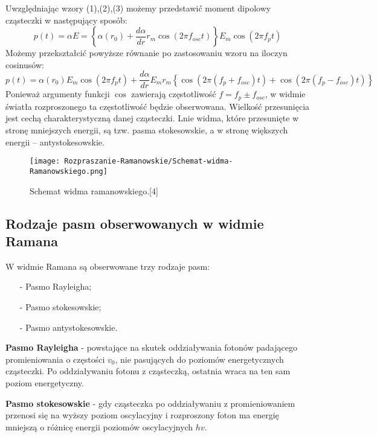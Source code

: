 Uwzględniając wzory (1),(2),(3) możemy przedstawić moment dipolowy cząsteczki w następujący
sposób:
\begin{equation}
	p(t) = \alpha E = 
	\left\{ 
		\alpha(r_{0}) + \frac{d\alpha}{dr}r_{m}\cos (2\pi f_{osc}t) 
	\right\}
	E_{m}\cos (2\pi f_{p}t)
\end{equation}
Możemy przekształcić powyższe równanie po zastosowaniu wzoru na iloczyn cosinusów:
\begin{equation}
	p(t) = \alpha(r_{0})E_{m}\cos (2\pi f_{p}t) + \frac{d\alpha}{dr}E_{m}r_{m}
	\left\{
		\cos (2\pi (f_{p} + f_{osc})t) + \cos (2\pi (f_{p} - f_{osc})t)
	 \right\}
\end{equation}
Ponieważ argumenty funkcji $\cos$ zawierają częstotliwość $f = f_{p} \pm f_{osc}$, w widmie światła
rozproszonego ta częstotliwość będzie obserwowana. Wielkość przesunięcia jest cechą charakterystyczną danej cząsteczki. Lnie widma, które przesunięte w stronę mniejszych energii, są tzw. pasma stokesowskie, a w stronę większych energii – antystokesowskie.
\begin{figure}[H]
	\begin{center}
		\texttt{[image: Rozpraszanie-Ramanowskie/Schemat-widma-Ramanowskiego.png]}
		\caption{Schemat widma ramanowskiego.[4]}
	\end{center}
\end{figure}

\subsection{Rodzaje pasm obserwowanych w widmie Ramana}
W widmie Ramana są obserwowane trzy rodzaje pasm:
\begin{itemize}
	\item[-]{Pasmo Rayleigha};
	\item[-]{Pasmo stokesowskie};
	\item[-]{Pasmo antystokesowskie}.
\end{itemize}

\textbf{Pasmo Rayleigha} - powstające na skutek oddziaływania fotonów padającego promieniowania o częstości $v_{0}$, nie pasujących do poziomów energetycznych cząsteczki. Po oddziaływaniu fotonu z cząsteczką, ostatnia wraca na ten sam poziom energetyczny.

\textbf{Pasmo stokesowskie} - gdy cząsteczka po oddziaływaniu z promieniowaniem przenosi się na wyższy poziom oscylacyjny i rozproszony foton ma energię mniejszą o różnicę energii poziomów oscylacyjnych $hv$.

